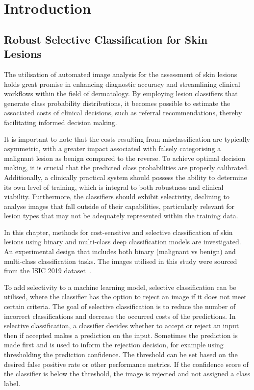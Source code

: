 \section{Introduction}
\label{sec:selective_introduction}
\subsection{Robust Selective Classification for Skin\\Lesions}
\label{subsec:robust and selective}
The utilisation of automated image analysis for the assessment of skin lesions holds great promise in enhancing diagnostic accuracy and streamlining clinical workflows within the field of dermatology. By employing lesion classifiers that generate class probability distributions, it becomes possible to estimate the associated costs of clinical decisions, such as referral recommendations, thereby facilitating informed decision making.

It is important to note that the costs resulting from misclassification are typically asymmetric, with a greater impact associated with falsely categorising a malignant lesion as benign compared to the reverse. To achieve optimal decision making, it is crucial that the predicted class probabilities are properly calibrated. Additionally, a clinically practical system should possess the ability to determine its own level of training, which is integral to both robustness and clinical viability. Furthermore, the classifiers should exhibit selectivity, declining to analyse images that fall outside of their capabilities, particularly relevant for lesion types that may not be adequately represented within the training data.

In this chapter, methods for cost-sensitive and selective classification of skin lesions using binary and multi-class deep classification models are investigated. An experimental design that includes both binary (malignant vs benign) and multi-class classification tasks. The images utilised in this study were sourced from the ISIC 2019 dataset~\citep{codella2018skin,combalia2019bcn20000,tschandl2018ham10000}.

To add selectivity to a machine learning model, selective classification can be utilised, where the classifier has the option to reject an image if it does not meet certain criteria. The goal of selective classification is to reduce the number of incorrect classifications and decrease the occurred costs of the predictions. In selective classification, a classifier decides whether to accept or reject an input then if accepted makes a prediction on the input. Sometimes the prediction is made first and is used to inform the rejection decision, for example using thresholding the prediction confidence. The threshold can be set based on the desired false positive rate or other performance metrics. If the confidence score of the classifier is below the threshold, the image is rejected and not assigned a class label.


